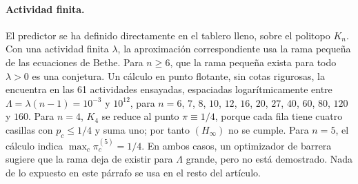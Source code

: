 \paragraph{Actividad finita.}
El predictor se ha definido directamente en el tablero lleno, sobre el politopo $K_n$. Con una
actividad finita $\lambda$, la aproximación correspondiente usa la rama pequeña de las ecuaciones de
Bethe. Para $n\ge6$, que la rama pequeña exista para todo $\lambda>0$ es una conjetura. Un cálculo en
punto flotante, sin cotas rigurosas, la encuentra en las 61 actividades ensayadas, espaciadas
logarítmicamente entre $\Lambda=\lambda(n-1)=10^{-3}$ y $10^{12}$, para $n=6$, $7$, $8$, $10$, $12$,
$16$, $20$, $27$, $40$, $60$, $80$, $120$ y $160$. Para $n=4$, $K_4$ se reduce al punto
$\pi\equiv1/4$, porque cada fila tiene cuatro casillas con $p_c\le1/4$ y suma uno; por tanto
$(H_\infty)$ no se cumple. Para $n=5$, el cálculo indica $\max_c\pi^{(5)}_c=1/4$. En ambos casos, un
optimizador de barrera sugiere que la rama deja de existir para $\Lambda$ grande, pero no está
demostrado. Nada de lo expuesto en este párrafo se usa en el resto del artículo.
